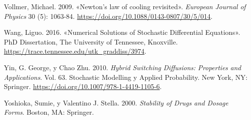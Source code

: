 \documentclass[
  spanish,
  us-letterpaper,
]{scrreprt}
\newlength{\cslhangindent}
\newenvironment{CSLReferences}[2] %
 {\begin{list}{}{%
  \setlength{\itemindent}{0pt}
  \setlength{\leftmargin}{0pt}
  \setlength{\parsep}{0pt}
  \ifodd #1
   \setlength{\leftmargin}{\cslhangindent}
   \setlength{\itemindent}{-1\cslhangindent}
  \fi
  \setlength{\itemsep}{#2\baselineskip}}}
 {\end{list}}
\numberwithin{equation}{section}
\theoremstyle{plain}
\theoremstyle{plain}
\theoremstyle{definition}
\theoremstyle{plain}
\theoremstyle{remark}
\begin{document}
\begin{CSLReferences}{1}{0}
Vollmer, Michael. 2009. {«Newton's law of cooling revisited»}.
\emph{European Journal of Physics} 30 (5): 1063-84.
\url{https://doi.org/10.1088/0143-0807/30/5/014}.

Wang, Liguo. 2016. {«Numerical Solutions of Stochastic Differential
Equations»}. PhD Dissertation, The University of Tennessee, Knoxville.
\url{https://trace.tennessee.edu/utk_graddiss/3974}.

Yin, G. George, y Chao Zhu. 2010. \emph{Hybrid Switching Diffusions:
Properties and Applications}. Vol. 63. Stochastic Modelling y Applied
Probability. New York, NY: Springer.
\url{https://doi.org/10.1007/978-1-4419-1105-6}.

Yoshioka, Sumie, y Valentino J. Stella. 2000. \emph{Stability of Drugs
and Dosage Forms}. Boston, MA: Springer.

\end{CSLReferences}
\end{document}
